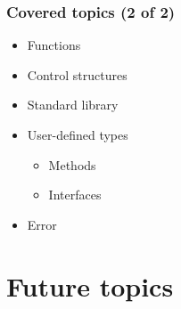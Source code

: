 \begin{frame}[t]
  \frametitle{Covered topics (2 of 2)}

  \begin{itemize}
  \item Functions
  \item Control structures
  \item Standard library
  \item User-defined types

    \begin{itemize}
    \item Methods
    \item Interfaces
    \end{itemize}
  \item Error
  \end{itemize}
\end{frame}

\section{Future topics}
\subsection*{}

